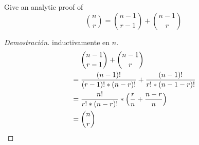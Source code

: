 \item Give an analytic proof of
\[ \binom{n}{r} = \binom{n-1}{r-1} + \binom{n-1}{r} \]
\begin{proof}[Demostración] inductivamente en $n$.
    \begin{align*}
    &\phantom{{}={}} \binom{n-1}{r-1} + \binom{n-1}{r}\\
    &= \frac{(n-1)!}{(r-1)! * (n-r)!} + \frac{(n-1)!}{r! * (n-1-r)!}\\
    &= \frac{n!}{r! * (n-r)!} * \Big( \frac{r}{n} + \frac{n - r}{n} \Big)\\
    &= \binom{n}{r} \qedhere
\end{align*}
\end{proof}